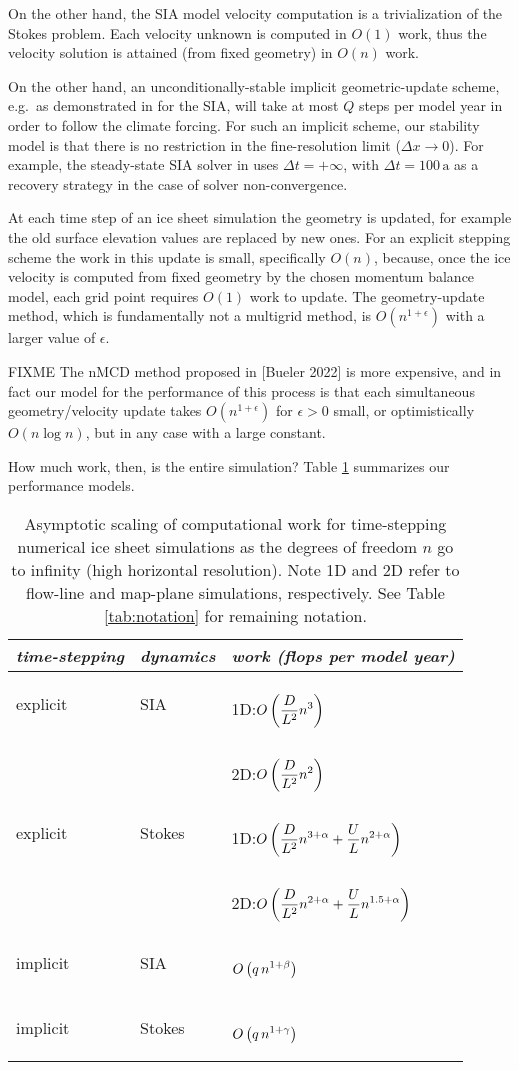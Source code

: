 \documentclass[twocolumn,letterpaper]{igs}
\newcommand\eps{\epsilon}
\begin{document}
On the other hand, the SIA model velocity computation is a trivialization of the Stokes problem.  Each velocity unknown is computed in $O(1)$ work, thus the velocity solution is attained (from fixed geometry) in $O(n)$ work.

On the other hand, an unconditionally-stable implicit geometric-update scheme, e.g.~as demonstrated in \citep{Bueler2016} for the SIA, will take at most $Q$ steps per model year in order to follow the climate forcing.  For such an implicit scheme, our stability model is that there is no restriction in the fine-resolution limit ($\Delta x \to 0$).  For example, the steady-state SIA solver in \cite{Bueler2016} uses $\Delta t=+\infty$, with $\Delta t = 100 \,\text{a}$ as a recovery strategy in the case of solver non-convergence.

At each time step of an ice sheet simulation the geometry is updated, for example the old surface elevation values are replaced by new ones.  For an explicit stepping scheme the work in this update is small, specifically $O(n)$, because, once the ice velocity is computed from fixed geometry by the chosen momentum balance model, each grid point requires $O(1)$ work to update.  The \cite{Bueler2016} geometry-update method, which is fundamentally not a multigrid method, is $O(n^{1+\eps})$ with a larger value of $\eps$.

FIXME The nMCD method proposed in [Bueler 2022] is more expensive, and in fact our model for the performance of this process is that each simultaneous geometry/velocity update takes $O(n^{1+\eps})$ for $\eps > 0$ small, or optimistically $O(n \log n)$, but in any case with a large constant.

How much work, then, is the entire simulation?  Table \ref{tab:performancemodel} summarizes our performance models.

\newcommand{\oo}[1]{{\LARGE \strut} \displaystyle O\left(#1\right)}
\setlength{\tabcolsep}{5pt}
\renewcommand{\arraystretch}{1.5}
\begin{table}[ht]
\begin{tabular}{lll}
\emph{time-stepping} & \emph{dynamics} & \emph{work (flops per model year)} \\ \hline
explicit & SIA    & 1D:\quad $\oo{\frac{D}{L^2} n^3}$ \\
         &        & 2D:\quad $\oo{\frac{D}{L^2} n^2}$ \\
explicit & Stokes & 1D:\quad $\oo{\frac{D}{L^2} n^{3+\alpha} + \frac{U}{L} n^{2+\alpha}}$ \\
         &        & 2D:\quad $\oo{\frac{D}{L^2} n^{2+\alpha} + \frac{U}{L} n^{1.5+\alpha}}$ \\
implicit & SIA    & $\oo{q\, n^{1+\beta}}$ \\
implicit & Stokes & $\oo{q\, n^{1+\gamma}}$
\end{tabular}
\caption{Asymptotic scaling of computational work for time-stepping numerical ice sheet simulations as the degrees of freedom $n$ go to infinity (high horizontal resolution).  Note 1D and 2D refer to flow-line and map-plane simulations, respectively.  See Table \ref{tab:notation} for remaining notation.}
\label{tab:performancemodel}
\end{table}
\end{document}
